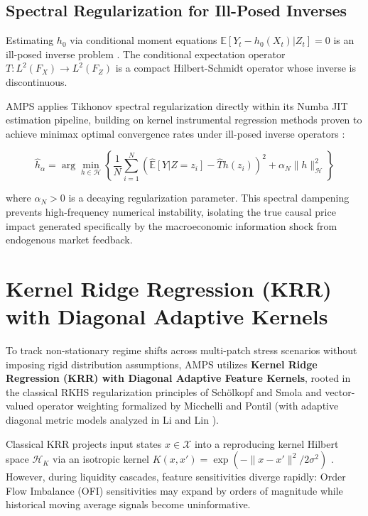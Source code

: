 \subsection{Spectral Regularization for Ill-Posed Inverses}

Estimating $h_0$ via conditional moment equations $\mathbb{E}[Y_t - h_0(X_t) | Z_t] = 0$ is an ill-posed inverse problem \cite{newey2003instrumental}. The conditional expectation operator $T: L^2(F_X) \to L^2(F_Z)$ is a compact Hilbert-Schmidt operator whose inverse is discontinuous. 

AMPS applies Tikhonov spectral regularization directly within its Numba JIT estimation pipeline, building on kernel instrumental regression methods proven to achieve minimax optimal convergence rates under ill-posed inverse operators \cite{singh2019kernel, meunier2024minimax}:

\begin{equation}
    \hat{h}_\alpha = \arg\min_{h \in \mathcal{H}} \left\{ \frac{1}{N} \sum_{i=1}^N \left( \hat{\mathbb{E}}[Y | Z = z_i] - \hat{T}h(z_i) \right)^2 + \alpha_N \|h\|_{\mathcal{H}}^2 \right\}
\end{equation}

where $\alpha_N > 0$ is a decaying regularization parameter. This spectral dampening prevents high-frequency numerical instability, isolating the true causal price impact generated specifically by the macroeconomic information shock from endogenous market feedback.

\section{Kernel Ridge Regression (KRR) with Diagonal Adaptive Kernels}

To track non-stationary regime shifts across multi-patch stress scenarios without imposing rigid distribution assumptions, AMPS utilizes \textbf{Kernel Ridge Regression (KRR) with Diagonal Adaptive Feature Kernels}, rooted in the classical RKHS regularization principles of Sch{\"o}lkopf and Smola \cite{scholkopf2002learning} and vector-valued operator weighting formalized by Micchelli and Pontil \cite{micchelli2005learning} (with adaptive diagonal metric models analyzed in Li and Lin \cite{li2025diagonal}).

Classical KRR projects input states $x \in \mathcal{X}$ into a reproducing kernel Hilbert space $\mathcal{H}_K$ via an isotropic kernel $K(x, x') = \exp(-\|x - x'\|^2 / 2\sigma^2)$ \cite{scholkopf2002learning}. However, during liquidity cascades, feature sensitivities diverge rapidly: Order Flow Imbalance (OFI) sensitivities may expand by orders of magnitude while historical moving average signals become uninformative.

